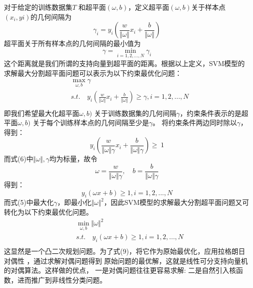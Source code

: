 \documentclass{progartcn}
\begin{document}
对于给定的训练数据集$T$ 和超平面$(\omega,b)$，定义超平面$(\omega,b)$关于样本点$(x_i,yi)$的几何间隔为
\begin{equation}
	\gamma_i = y_i(\frac{w}{\Vert\omega \Vert}x_i+\frac{b}{\Vert\omega \Vert})
\end{equation}
超平面关于所有样本点的几何间隔的最小值为
\begin{equation}
	\gamma = \min_{i=1,2,...,N} \gamma_i
\end{equation}
这个距离就是我们所谓的支持向量到超平面的距离。根据以上定义，SVM模型的求解最大分割超平面问题可以表示为以下约束最优化问题：
\begin{equation}
	\begin{aligned}
		&\max_{\omega,b} \gamma \\
		&s.t.\quad y_i(\frac{w}{\Vert\omega \Vert}x_i+\frac{b}{\Vert\omega \Vert}) \geq\gamma, i=1,2,...,N \\ 
	\end{aligned}
\end{equation}
即我们希望最大化超平面$\omega,b)$ 关于训练数据集的几何间隔$\gamma$，约束条件表示的是超
平面$\omega,b)$  关于每个训练样本点的几何间隔至少是$\gamma$。
将约束条件两边同时除以$\gamma$，得到：
\begin{equation}
	y_i(\frac{w}{\Vert\omega \Vert \gamma}x_i+\frac{b}{\Vert\omega \Vert \gamma}) \geq\ 1
\end{equation}
而式(6)中$\Vert\omega\Vert,\gamma$均为标量，故令
\begin{equation}
	\omega = \frac{w}{\Vert\omega \Vert \gamma},\quad b = \frac{b}{\Vert\omega \Vert \gamma}
\end{equation}
得到：
\begin{equation}
	y_i(\omega x+b) \geq 1,i=1,2,...,N 
\end{equation}
而式(5)中最大化$\gamma$，即最小化$\Vert \omega \Vert ^2$，因此SVM模型的求解最大分割超平面问题又可转化为以下约束最优化问题。
\begin{equation}
	\begin{aligned}
		&\min_{\omega,b} \Vert \omega \Vert ^2 \\
		&s.t.\quad y_i(\omega x+b) \geq 1,i=1,2,...,N  \\ 
	\end{aligned}
\end{equation}
这显然是一个凸二次规划问题。为了式(9)，将它作为原始最优化，应用拉格朗日对偶性 ，通过求解对偶问题得到
原始问题的最优解，这就是线性可分支持向量机的对偶算法。这样做的优点， 一是对偶问题往往更容易求解: 二是自然引入核函数，进而推广到非线性分类问题。
\end{document}
